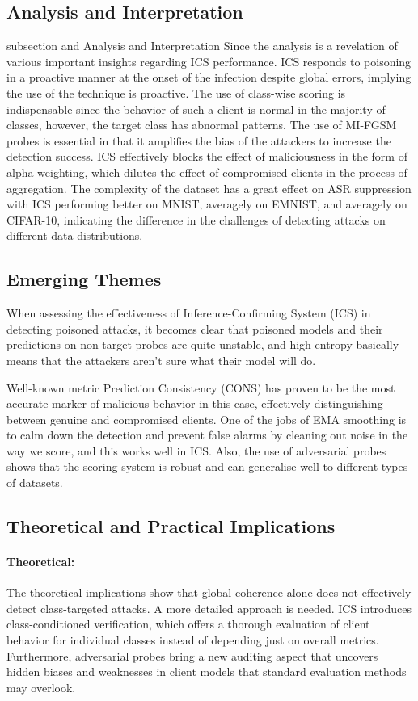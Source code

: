 \documentclass[conference]{IEEEtran}
\begin{document}
\subsection{Analysis and Interpretation}
subsection and Analysis and Interpretation Since the analysis is a revelation of various important insights regarding ICS performance. ICS responds to poisoning in a proactive manner at the onset of the infection despite global errors, implying the use of the technique is proactive. The use of class-wise scoring is indispensable since the behavior of such a client is normal in the majority of classes, however, the target class has abnormal patterns. The use of MI-FGSM probes is essential in that it amplifies the bias of the attackers to increase the detection success. ICS effectively blocks the effect of maliciousness in the form of alpha-weighting, which dilutes the effect of compromised clients in the process of aggregation. The complexity of the dataset has a great effect on ASR suppression with ICS performing better on MNIST, averagely on EMNIST, and averagely on CIFAR-10, indicating the difference in the challenges of detecting attacks on different data distributions.
\subsection{Emerging Themes}
When assessing the effectiveness of Inference-Confirming System (ICS) in detecting poisoned attacks, it becomes clear that poisoned models and their predictions on non-target probes are quite unstable, and high entropy basically means that the attackers aren't sure what their model will do. 

Well-known metric Prediction Consistency (CONS) has proven to be the most accurate marker of malicious behavior in this case, effectively distinguishing between genuine and compromised clients. One of the jobs of EMA smoothing is to calm down the detection and prevent false alarms by cleaning out noise in the way we score, and this works well in ICS. Also, the use of adversarial probes shows that the scoring system is robust and can generalise well to different types of datasets.

\subsection{Theoretical and Practical Implications}
\paragraph{Theoretical:}
The theoretical implications show that global coherence alone does not effectively detect class-targeted attacks. A more detailed approach is needed. ICS introduces class-conditioned verification, which offers a thorough evaluation of client behavior for individual classes instead of depending just on overall metrics. Furthermore, adversarial probes bring a new auditing aspect that uncovers hidden biases and weaknesses in client models that standard evaluation methods may overlook.
\end{document}
